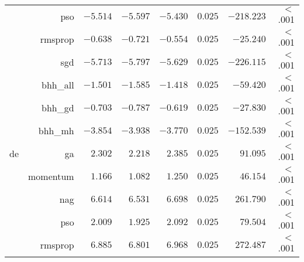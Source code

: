 \begin{table}[H]
{\begin{tabular}{lrrrrrrr}
			                     & pso                  & $-5.514$             & $-5.597$                                        & $-5.430$             & $0.025$              & $-218.223$           & $<$ .001    \\
			                     & rmsprop              & $-0.638$             & $-0.721$                                        & $-0.554$             & $0.025$              & $-25.240$            & $<$ .001    \\
			                     & sgd                  & $-5.713$             & $-5.797$                                        & $-5.629$             & $0.025$              & $-226.115$           & $<$ .001    \\
			                     & bhh\_all             & $-1.501$             & $-1.585$                                        & $-1.418$             & $0.025$              & $-59.420$            & $<$ .001    \\
			                     & bhh\_gd              & $-0.703$             & $-0.787$                                        & $-0.619$             & $0.025$              & $-27.830$            & $<$ .001    \\
			                     & bhh\_mh              & $-3.854$             & $-3.938$                                        & $-3.770$             & $0.025$              & $-152.539$           & $<$ .001    \\
			de                   & ga                   & $2.302$              & $2.218$                                         & $2.385$              & $0.025$              & $91.095$             & $<$ .001    \\
			$ $                  & momentum             & $1.166$              & $1.082$                                         & $1.250$              & $0.025$              & $46.154$             & $<$ .001    \\
			                     & nag                  & $6.614$              & $6.531$                                         & $6.698$              & $0.025$              & $261.790$            & $<$ .001    \\
			                     & pso                  & $2.009$              & $1.925$                                         & $2.092$              & $0.025$              & $79.504$             & $<$ .001    \\
			                     & rmsprop              & $6.885$              & $6.801$                                         & $6.968$              & $0.025$              & $272.487$            & $<$ .001    \\

\end{tabular}}
\end{table}

